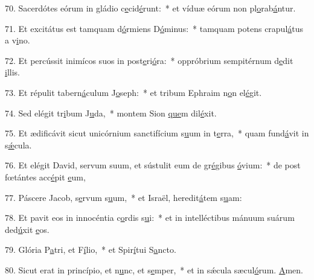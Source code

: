 70. Sacerdótes eórum in gládio c\uline{e}cid\uline{é}runt:~* et víduæ eórum non pl\uline{o}rab\uline{á}ntur.\par 
71. Et excitátus est tamquam d\uline{ó}rmiens D\uline{ó}minus:~* tamquam potens crapul\uline{á}tus a v\uline{i}no.\par 
72. Et percússit inimícos suos in post\uline{e}ri\uline{ó}ra:~* oppróbrium sempitérnum d\uline{e}dit \uline{i}llis.\par 
73. Et répulit tabern\uline{á}culum J\uline{o}seph:~* et tribum Ephraim n\uline{o}n el\uline{é}git.\par 
74. Sed elégit tr\uline{i}bum J\uline{u}da,~* montem Sion \uline{que}m dil\uline{é}xit.\par 
75. Et ædificávit sicut unicórnium sanctifícium s\uline{u}um in t\uline{e}rra,~* quam fund\uline{á}vit in s\uline{ǽ}cula.\par 
76. Et elégit David, servum suum, et sústulit eum de gr\uline{é}gibus \uline{ó}vium:~* de post fœtántes acc\uline{é}pit \uline{e}um,\par 
77. Páscere Jacob, s\uline{e}rvum s\uline{u}um,~* et Israël, heredit\uline{á}tem s\uline{u}am:\par 
78. Et pavit eos in innocéntia c\uline{o}rdis s\uline{u}i:~* et in intelléctibus mánuum suárum ded\uline{ú}xit \uline{e}os.\par 
79. Glória P\uline{a}tri, et F\uline{í}lio,~* et Spir\uline{í}tui S\uline{a}ncto.\par 
80. Sicut erat in princípio, et n\uline{u}nc, et s\uline{e}mper,~* et in sǽcula sæcul\uline{ó}rum. \uline{A}men.\par 

